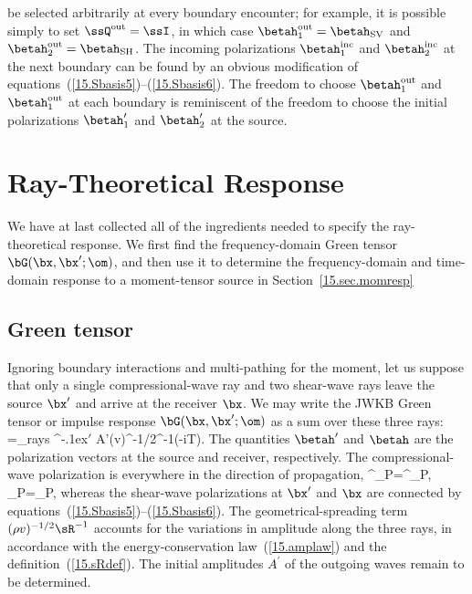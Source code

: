be selected arbitrarily at every boundary encounter;
for example, it is possible simply to
set $\ssQ^{\rm out}=\ssI$, in which case
$\betah_1^{\rm out}=\betah_{\rm SV}$
and $\betah_2^{\rm out}=\betah_{\rm SH}$.  
The incoming polarizations $\betah_1^{\rm inc}$
and $\betah_2^{\rm inc}$ at the next boundary
can be found by an obvious modification of
equations~(\ref{15.Sbasis5})--(\ref{15.Sbasis6}).
The freedom to choose
$\betah_1^{\rm out}$ and $\betah_1^{\rm out}$
at each boundary is reminiscent of the freedom to
choose the initial polarizations $\betah^{\prime}_1$
and $\betah^{\prime}_2$ at the source.
%
%
%
%

\section{Ray-Theoretical Response}
%
%

We have at last collected all of the ingredients needed
to specify the ray-theoretical response.  We first find
the frequency-domain Green tensor $\bG(\bx,\bx';\om)$,
and then use it to determine the frequency-domain and
time-domain response to a moment-tensor source in
Section~\ref{15.sec.momresp}

\subsection{Green tensor}
%
%

Ignoring boundary interactions and multi-pathing for the
moment, let us suppose that only a single
compressional-wave ray and two shear-wave rays
leave the source $\bx'$ and arrive at the receiver $\bx$.
We may write the JWKB Green tensor or impulse response
$\bG(\bx,\bx';\om)$ as a sum over these three rays:
\eq \label{15.Green1}
\bG=\sum_{\rm rays}
\betah\betah^{\raise-.1ex\hbox{$\scriptstyle\prime$}}
A'(\rho v)^{-1/2}\sR^{-1}\exp(-i\om T).
\en
The quantities $\betah'$ and $\betah$ are the
polarization vectors at the source and receiver,
respectively.  The compressional-wave polarization
is everywhere in the direction of propagation,
\eq \label{15.Green2}
\betah^{\prime}_{\rm P}=\hat{\bp}^{\prime}_{\rm P},\qquad
\betah_{\rm P}=\hat{\bp}_{\rm P},
\en
whereas the shear-wave polarizations at $\bx'$
and $\bx$ are connected by equations~(\ref{15.Sbasis5})--(\ref{15.Sbasis6}).
The geometrical-spreading term $(\rho v)^{-1/2}\sR^{-1}$
accounts for the variations in amplitude along the three
rays, in accordance with the energy-conservation
law~(\ref{15.amplaw}) and the definition~(\ref{15.sRdef}).
The initial amplitudes $A^{\prime}$ of the outgoing waves
remain to be determined.

